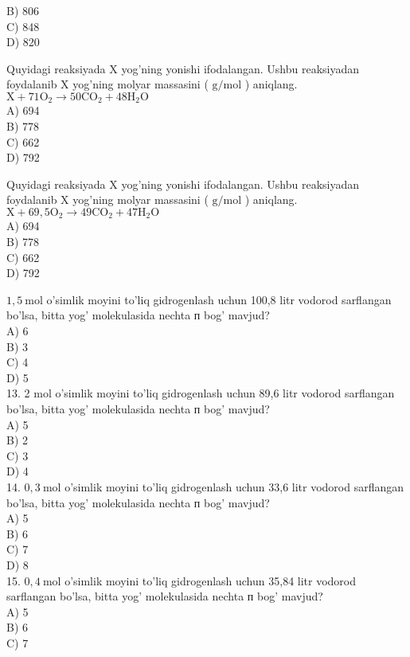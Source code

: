 B) 806\\
C) 848\\
D) 820
  \item Quyidagi reaksiyada X yog'ning yonishi ifodalangan. Ushbu reaksiyadan foydalanib X yog'ning molyar massasini ( $\mathrm{g} / \mathrm{mol}$ ) aniqlang. $\mathrm{X}+71 \mathrm{O}_{2} \rightarrow 50 \mathrm{CO}_{2}+48 \mathrm{H}_{2} \mathrm{O}$\\
A) 694\\
B) 778\\
C) 662\\
D) 792
  \item Quyidagi reaksiyada X yog'ning yonishi ifodalangan. Ushbu reaksiyadan foydalanib X yog'ning molyar massasini ( $\mathrm{g} / \mathrm{mol}$ ) aniqlang.\\
$\mathrm{X}+69,5 \mathrm{O}_{2} \rightarrow 49 \mathrm{CO}_{2}+47 \mathrm{H}_{2} \mathrm{O}$\\
A) 694\\
B) 778\\
C) 662\\
D) 792
  \item $1,5 \mathrm{~mol}$ o'simlik moyini to'liq gidrogenlash uchun 100,8 litr vodorod sarflangan bo'lsa, bitta yog' molekulasida nechta п bog' mavjud?\\
A) 6\\
B) 3\\
C) 4\\
D) 5\\
13. 2 mol o'simlik moyini to'liq gidrogenlash uchun 89,6 litr vodorod sarflangan bo'lsa, bitta yog' molekulasida nechta п bog' mavjud?\\
A) 5\\
B) 2\\
C) 3\\
D) 4\\
14. $0,3 \mathrm{~mol}$ o'simlik moyini to'liq gidrogenlash uchun 33,6 litr vodorod sarflangan bo'lsa, bitta yog' molekulasida nechta $п$ bog' mavjud?\\
A) 5\\
B) 6\\
C) 7\\
D) 8\\
15. $0,4 \mathrm{~mol}$ o'simlik moyini to'liq gidrogenlash uchun 35,84 litr vodorod sarflangan bo'lsa, bitta yog' molekulasida nechta $п$ bog' mavjud?\\
A) 5\\
B) 6\\
C) 7\\
